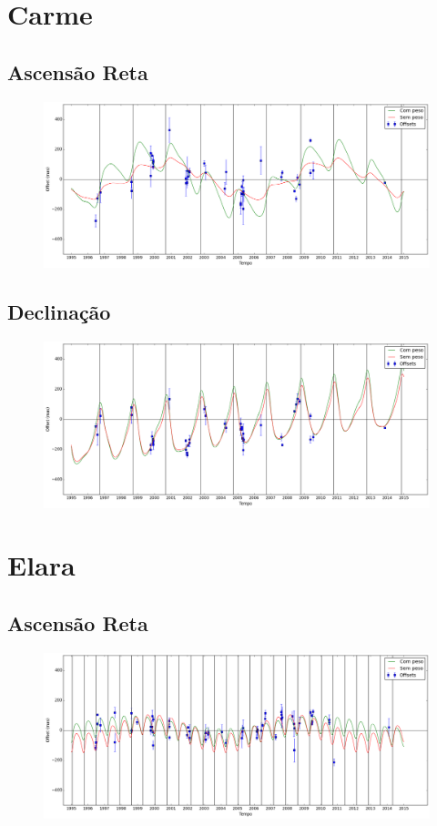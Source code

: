 \documentclass[11pt,a4paper]{report}
\begin{document}
\chapter*{Carme}
\section*{Ascensão Reta}
\begin{figure}[h]
\includegraphics[scale=0.35]{Carme/RA.png} 
\end{figure}

\section*{Declinação}

\begin{figure}[h]
\includegraphics[scale=0.35]{Carme/DEC.png} 
\end{figure}

\chapter*{Elara}
\section*{Ascensão Reta}

\begin{figure}[h]
\includegraphics[scale=0.35]{Elara/RA.png} 
\end{figure}
\end{document}
